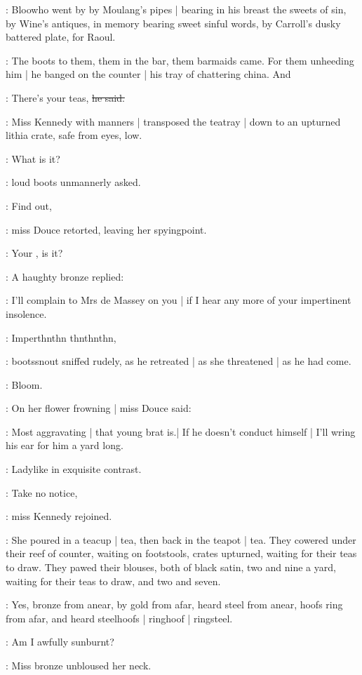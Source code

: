 :
Bloowho went by by Moulang's pipes |
bearing in his breast the sweets of sin,
by Wine's antiques,
in memory bearing sweet sinful words,
by Carroll's dusky battered plate,
for Raoul.

:
The boots to them,
them in the bar,
them barmaids came.
For them unheeding him |
he banged on the counter |
his tray of chattering china.
And

\boots:
There's your teas,
\sout{he said.}

:
Miss Kennedy with manners |
transposed the teatray |
down to an upturned lithia crate,
safe from eyes,
low.

\boots:
What is it?

:
loud boots unmannerly asked.

\MissD:
Find out,

:
miss Douce retorted,
leaving her spyingpoint.

\boots:
Your ,
is it?

:
A haughty bronze replied:

\MissD:
I'll complain to Mrs de Massey on you |
if I hear any more of your impertinent insolence.

\boots:
Imperthnthn thnthnthn,

:
bootssnout sniffed rudely,
as he retreated |
as she threatened |
as he had come.

:
Bloom.

:
On her flower frowning |
miss Douce said:

\MissD:
Most aggravating |
that young brat is.|
If he doesn't conduct himself |
I'll wring his ear for him a yard long.

:
Ladylike in exquisite contrast.

\MissK:
Take no notice,

:
miss Kennedy rejoined.

:
She poured in a teacup |
tea,
then back in the teapot |
tea.
They cowered under their reef of counter,
waiting on footstools,
crates upturned,
waiting for their teas to draw.
They pawed their blouses,
both of black satin,
two and nine a yard,
waiting for their teas to draw,
and two and seven.

:
Yes,
bronze from anear,
by gold from afar,
heard steel from anear,
hoofs ring from afar,
and heard steelhoofs |
ringhoof |
ringsteel.

\MissD:
Am I awfully sunburnt?

:
Miss bronze unbloused her neck.

